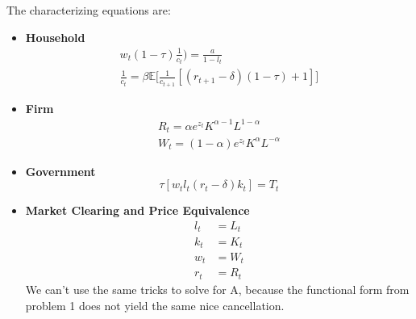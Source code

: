 \documentclass[12pt]{article}
\newenvironment{problem}[2][Problem]{\begin{trivlist}
\item[\hskip \labelsep {\bfseries #1}\hskip \labelsep {\bfseries #2.}]}{\end{trivlist}}
\theoremstyle{definition}
\theoremstyle{definition}
\theoremstyle{definition}
\theoremstyle{definition}
\begin{document}
\begin{problem}{2}
The characterizing equations are:
\begin{itemize}
\item \textbf{Household}
\begin{align}
w_t(1-\tau)\frac{1}{c_t}) = \frac{a}{1-l_t} \\
\frac{1}{c_t} = \beta \mathbb{E} \big[ \frac{1}{c_{t+1}}[(r_{t+1}-\delta)(1-\tau) +1] \big]
\end{align}

\item \textbf{Firm}
\begin{align}
R_t = \alpha e^{z_t} K^{\alpha - 1} L^{1-\alpha} \\
W_t = (1 - \alpha) e^{z_t} K^\alpha L^{-\alpha}
\end{align}
\item \textbf{Government}
\begin{equation}
\tau[w_tl_t(r_t - \delta)k_t] = T_t
\end{equation}
\item \textbf{Market Clearing and Price Equivalence}
\begin{align}
l_t &= L_t \\
k_t &= K_t \\
w_t &= W_t \\
r_t &= R_t 
\end{align}
We can't use the same tricks to solve for A, because the functional form from problem 1 does not yield the same nice cancellation.
\end{itemize}
\end{problem}
\end{document}
